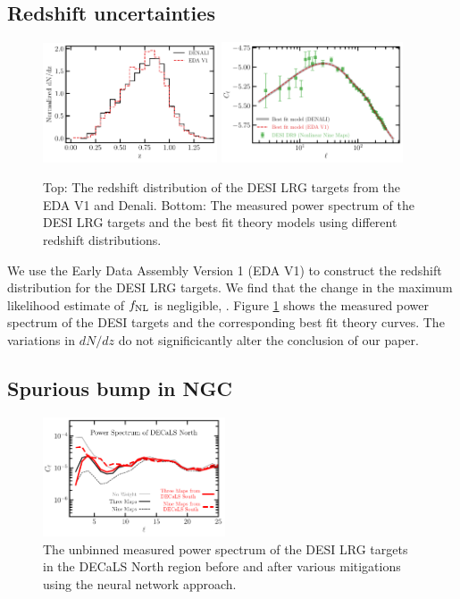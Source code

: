 \subsection{Redshift uncertainties}\label{ssec:nzuncer}

\begin{figure}
\raggedleft
\includegraphics[width=0.46\textwidth]{figures/nz_lrg_eda.pdf}
\includegraphics[width=0.48\textwidth]{figures/cl_nz.pdf}\caption{Top: The redshift distribution of the DESI LRG targets from the EDA V1 and Denali. Bottom: The measured power spectrum of the DESI LRG targets and the best fit theory models using different redshift distributions.}\label{fig:cl_nz}
\end{figure}

We use the Early Data Assembly Version 1 (EDA V1) to construct the redshift distribution for the DESI LRG targets. We find that the change in the maximum likelihood estimate of $f_{\rm NL}$ is negligible, . Figure \ref{fig:cl_nz} shows the measured power spectrum of the DESI targets and the corresponding best fit theory curves. The variations in $dN/dz$ do not significicantly alter the conclusion of our paper.

\subsection{Spurious bump in NGC}\label{ssec:ndecalsbump}

\begin{figure}
    \centering
    \includegraphics[width=0.48\textwidth]{figures/cl_SonN.pdf}
    \caption{The unbinned measured power spectrum of the DESI LRG targets in the DECaLS North region before and after various mitigations using the neural network approach.}
    \label{fig:clSonN}
\end{figure}


